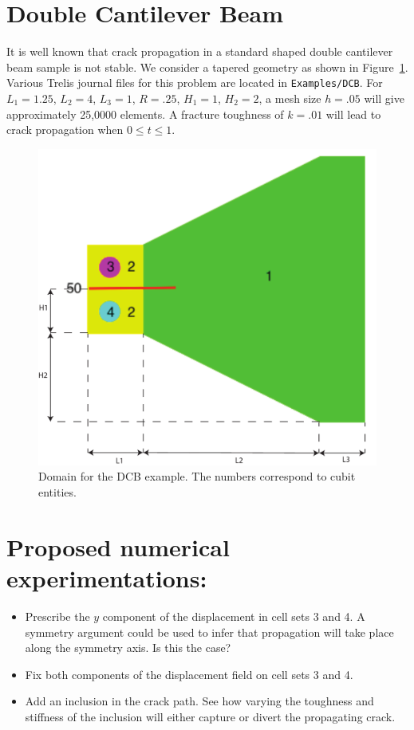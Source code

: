 \documentclass[10pt,oneside]{report}
\begin{document}
\section{Double Cantilever Beam}
It is well known that crack propagation in a standard shaped double cantilever beam sample is not stable. We consider a tapered geometry as shown in Figure~\ref{fig:DCB}. Various Trelis journal files for this problem are located in \verb+Examples/DCB+. For $L_1=1.25$, $L_2 = 4$, $L_3=1$, $R = .25$, $H_1=1$, $H_2 = 2$, a mesh size $h=.05$ will give approximately 25,0000 elements. A fracture toughness of $k=.01$ will lead to crack propagation when $0 \le t \le 1$.

\begin{figure}[H]
\centering
	\includegraphics[width = .5\textwidth]{Examples/DCB/Geometry.pdf}
\caption{Domain for the DCB example. The numbers correspond to cubit entities.}
\label{fig:DCB}
\end{figure}

\section*{Proposed numerical experimentations:}
\begin{itemize}
	\item Prescribe the $y$ component of the displacement in cell sets 3 and 4. A symmetry argument could be used to infer that propagation will take place along the symmetry axis. Is this the case? 
	\item Fix both components of the displacement field on cell sets 3 and 4. 
	\item Add an inclusion in the crack path. See how varying the toughness and stiffness of the inclusion will either capture or divert the propagating crack.
\end{itemize}
\end{document}
